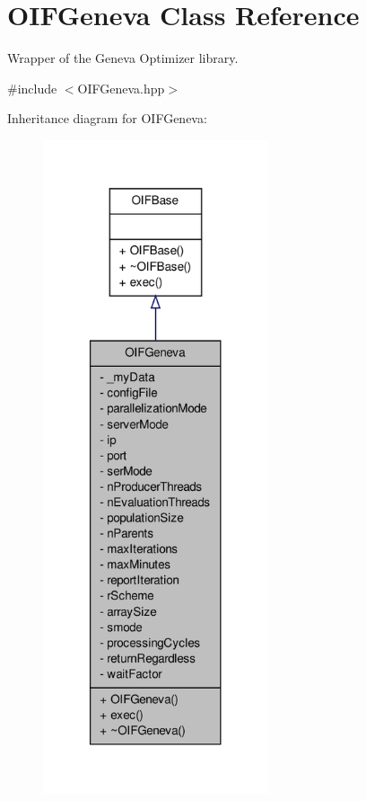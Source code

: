 \hypertarget{classOIFGeneva}{
\section{OIFGeneva Class Reference}
\label{d4/dce/classOIFGeneva}
}


Wrapper of the Geneva Optimizer library.  




{\ttfamily \#include $<$OIFGeneva.hpp$>$}



Inheritance diagram for OIFGeneva:\nopagebreak
\begin{figure}[H]
\begin{center}
\leavevmode
\includegraphics[width=188pt]{d9/d88/classOIFGeneva__inherit__graph}
\end{center}
\end{figure}


